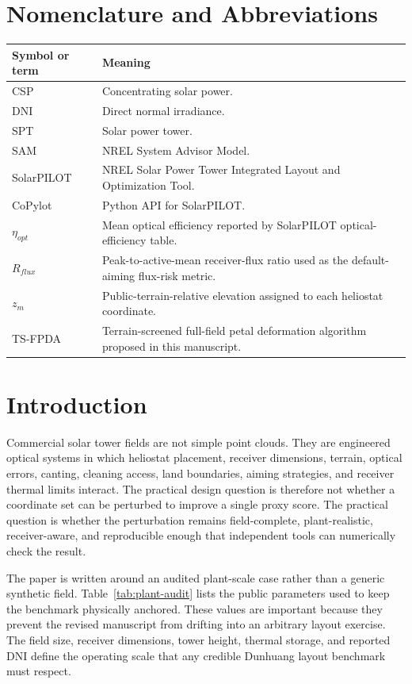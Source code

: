 \documentclass[final,3p,times]{elsarticle}
\begin{document}
\section{Nomenclature and Abbreviations}
\begin{longtable}{p{}p{}}
\toprule
Symbol or term & Meaning \\
\midrule
CSP & Concentrating solar power. \\
DNI & Direct normal irradiance. \\
SPT & Solar power tower. \\
SAM & NREL System Advisor Model. \\
SolarPILOT & NREL Solar Power Tower Integrated Layout and Optimization Tool. \\
CoPylot & Python API for SolarPILOT. \\
$\eta_{opt}$ & Mean optical efficiency reported by SolarPILOT optical-efficiency table. \\
$R_{flux}$ & Peak-to-active-mean receiver-flux ratio used as the default-aiming flux-risk metric. \\
$z_m$ & Public-terrain-relative elevation assigned to each heliostat coordinate. \\
TS-FPDA & Terrain-screened full-field petal deformation algorithm proposed in this manuscript. \\
\bottomrule
\end{longtable}

\section{Introduction}
Commercial solar tower fields are not simple point clouds. They are engineered optical systems in which heliostat placement, receiver dimensions, terrain, optical errors, canting, cleaning access, land boundaries, aiming strategies, and receiver thermal limits interact. The practical design question is therefore not whether a coordinate set can be perturbed to improve a single proxy score. The practical question is whether the perturbation remains field-complete, plant-realistic, receiver-aware, and reproducible enough that independent tools can numerically check the result.

The paper is written around an audited plant-scale case rather than a generic synthetic field. Table~\ref{tab:plant-audit} lists the public parameters used to keep the benchmark physically anchored. These values are important because they prevent the revised manuscript from drifting into an arbitrary layout exercise. The field size, receiver dimensions, tower height, thermal storage, and reported DNI define the operating scale that any credible Dunhuang layout benchmark must respect.
\end{document}
